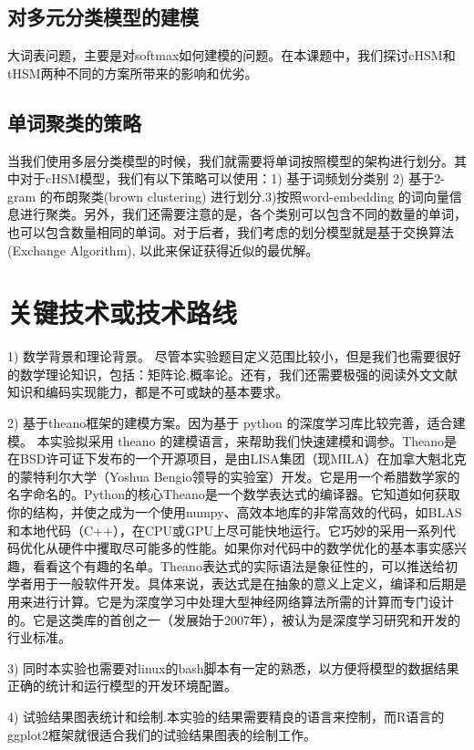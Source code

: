 \documentclass[twoside]{buaathesis}
\begin{document}
\subsection{对多元分类模型的建模}
大词表问题，主要是对softmax如何建模的问题。在本课题中，我们探讨cHSM和tHSM两种不同的方案所带来的影响和优劣。
\subsection{单词聚类的策略}
当我们使用多层分类模型的时候，我们就需要将单词按照模型的架构进行划分。其中对于cHSM模型，我们有以下策略可以使用：1) 基于词频划分类别 2) 基于2-gram 的布朗聚类(brown clustering) 进行划分.3)按照word-embedding 的词向量信息进行聚类。另外，我们还需要注意的是，各个类别可以包含不同的数量的单词，也可以包含数量相同的单词。对于后者，我们考虑的划分模型就是基于交换算法(Exchange Algorithm), 以此来保证获得近似的最优解。

\section{关键技术或技术路线}

1) 数学背景和理论背景。 尽管本实验题目定义范围比较小，但是我们也需要很好的数学理论知识，包括：矩阵论,概率论。还有，我们还需要极强的阅读外文文献知识和编码实现能力，都是不可或缺的基本要求。

2) 基于theano框架的建模方案。因为基于 python 的深度学习库比较完善，适合建模。 本实验拟采用 theano 的建模语言，来帮助我们快速建模和调参。Theano是在BSD许可证下发布的一个开源项目，是由LISA集团（现MILA）在加拿大魁北克的蒙特利尔大学（Yoshua Bengio领导的实验室）开发。它是用一个希腊数学家的名字命名的。Python的核心Theano是一个数学表达式的编译器。它知道如何获取你的结构，并使之成为一个使用numpy、高效本地库的非常高效的代码，如BLAS和本地代码（C++），在CPU或GPU上尽可能快地运行。它巧妙的采用一系列代码优化从硬件中攫取尽可能多的性能。如果你对代码中的数学优化的基本事实感兴趣，看看这个有趣的名单。Theano表达式的实际语法是象征性的，可以推送给初学者用于一般软件开发。具体来说，表达式是在抽象的意义上定义，编译和后期是用来进行计算。它是为深度学习中处理大型神经网络算法所需的计算而专门设计的。它是这类库的首创之一（发展始于2007年），被认为是深度学习研究和开发的行业标准。

3) 同时本实验也需要对linux的bash脚本有一定的熟悉，以方便将模型的数据结果正确的统计和运行模型的开发环境配置。

4) 试验结果图表统计和绘制.本实验的结果需要精良的语言来控制，而R语言的ggplot2框架就很适合我们的试验结果图表的绘制工作。
\end{document}
